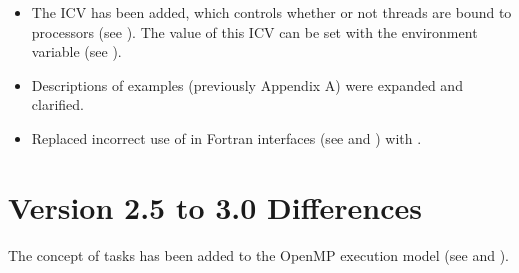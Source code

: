 \begin{itemize}
\item The  ICV has been added, which controls whether or not threads are bound 
to processors (see 
). 
The value of this ICV can be set with 
the  environment variable (see 
).

\item Descriptions of examples (previously Appendix A) were expanded and 
clarified.

\item Replaced incorrect use of  in Fortran interfaces (see 
and ) with 
. 
\end{itemize}







\section{Version 2.5 to 3.0 Differences}
\label{sec:Version 2.5 to 3.0 Differences}
The concept of tasks has been added to the OpenMP execution model (see 
 and 
). 

